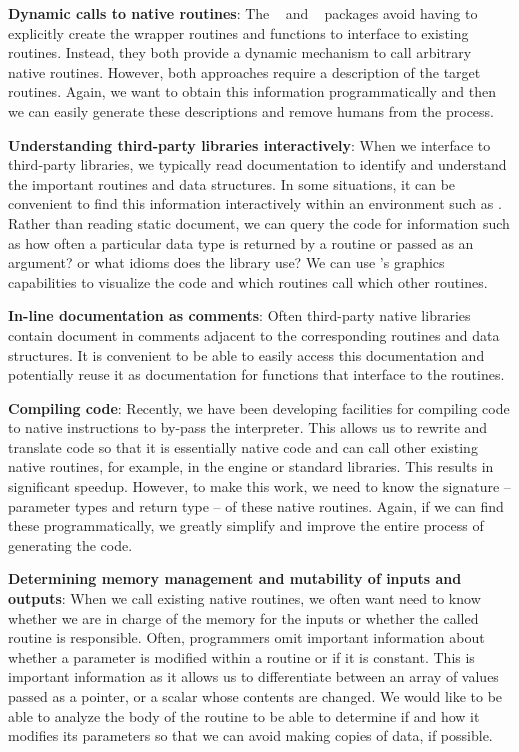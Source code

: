 \documentclass[article]{jss}
\def\C{\proglang{C}}
\def\R{\proglang{R}}
\def\Rpkg#1{\pkg{#1}}
\begin{document}
\textbf{Dynamic calls to native routines}: The
\Rpkg{rdyncall}~\cite{bib:rdyncall} and \Rpkg{Rffi}~\cite{bib:Rffi}
\R{} packages avoid having to explicitly create the wrapper routines
and \R{} functions to interface to existing \C{} routines. Instead,
they both provide a dynamic mechanism to call arbitrary native
routines.  However, both approaches require a description of the
target routines.  Again, we want to obtain this information
programmatically and then we can easily generate these descriptions
and remove humans from the process.

\textbf{Understanding third-party libraries interactively}: When we
interface to third-party libraries, we typically read documentation to
identify and understand the important routines and data structures.
In some situations, it can be convenient to find this information
interactively within an environment such as \R.  Rather than reading
static document, we can query the code for information such as how
often a particular data type is returned by a routine or passed as an
argument? or what idioms does the library use?  We can use \R's
graphics capabilities to visualize the code and which routines call
which other routines.

\textbf{In-line documentation as comments}: Often third-party native
libraries contain document in comments adjacent to the corresponding
routines and data structures.  It is convenient to be able to easily
access this documentation and potentially reuse it as \R{}
documentation for functions that interface to the routines.

\textbf{Compiling \R{} code}:  Recently, we have been developing \R{} facilities for compiling \R{}
code to native instructions to by-pass the \R{} interpreter.  This
allows us to rewrite and translate \R{} code so that it is essentially
native code and can call other existing native routines, for example,
in the \R{} engine or standard \C{} libraries.  This results in
significant speedup.  However, to make this work, we need to know the
signature -- parameter types and return type -- of these native
routines.  Again, if we can find these programmatically, we greatly
simplify and improve the entire process of generating the code.

\textbf{Determining memory management and mutability of inputs and
  outputs}: When we call existing native routines, we often want need
to know whether we are in charge of the memory for the inputs or
whether the called routine is responsible.  Often, programmers omit
important information about whether a parameter is modified within a
routine or if it is constant.  This is important information as it
allows us to differentiate between an array of values passed as a
pointer, or a scalar whose contents are changed.  We would like to be
able to analyze the body of the routine to be able to determine if and
how it modifies its parameters so that we can avoid making copies of
data, if possible.
\end{document}
